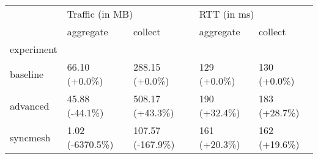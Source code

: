 \begin{tabular}{lllll}
\toprule
{} & \multicolumn{2}{l}{Traffic (in MB)} & \multicolumn{2}{l}{RTT (in ms)} \\
{} &        aggregate &           collect &     aggregate &       collect \\
experiment &                  &                   &               &               \\
\midrule
baseline   &    66.10 (+0.0\%) &    288.15 (+0.0\%) &   129 (+0.0\%) &   130 (+0.0\%) \\
advanced   &   45.88 (-44.1\%) &   508.17 (+43.3\%) &  190 (+32.4\%) &  183 (+28.7\%) \\
syncmesh   &  1.02 (-6370.5\%) &  107.57 (-167.9\%) &  161 (+20.3\%) &  162 (+19.6\%) \\
\bottomrule
\end{tabular}
